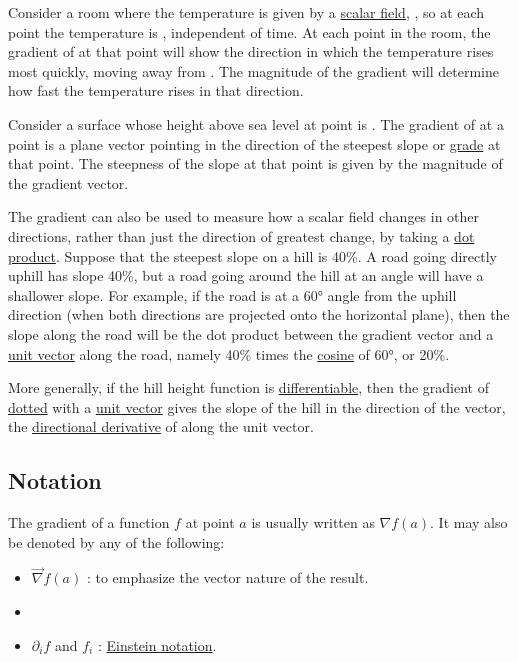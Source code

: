 \documentclass[
]{article}
\begin{document}
Consider a room where the temperature is given by a
\href{scalar_field}{scalar field}, , so at each point the temperature is
, independent of time. At each point in the room, the gradient of at
that point will show the direction in which the temperature rises most
quickly, moving away from . The magnitude of the gradient will determine
how fast the temperature rises in that direction.

Consider a surface whose height above sea level at point is . The
gradient of at a point is a plane vector pointing in the direction of
the steepest slope or \href{Grade_(slope)}{grade} at that point. The
steepness of the slope at that point is given by the magnitude of the
gradient vector.

The gradient can also be used to measure how a scalar field changes in
other directions, rather than just the direction of greatest change, by
taking a \href{dot_product}{dot product}. Suppose that the steepest
slope on a hill is 40\%. A road going directly uphill has slope 40\%,
but a road going around the hill at an angle will have a shallower
slope. For example, if the road is at a 60° angle from the uphill
direction (when both directions are projected onto the horizontal
plane), then the slope along the road will be the dot product between
the gradient vector and a \href{unit_vector}{unit vector} along the
road, namely 40\% times the \url{cosine} of 60°, or 20\%.

More generally, if the hill height function is
\href{differentiable_function}{differentiable}, then the gradient of
\href{dot_product}{dotted} with a \href{unit_vector}{unit vector} gives
the slope of the hill in the direction of the vector, the
\href{directional_derivative}{directional derivative} of along the unit
vector.

\hypertarget{notation}{%
\subsection{Notation}\label{notation}}

The gradient of a function \(f\) at point \(a\) is usually written as
\(\nabla f (a)\). It may also be denoted by any of the following:

\begin{itemize}
\item
  \(\vec{\nabla} f (a)\) : to emphasize the vector nature of the result.
\item
\item
  \(\partial_i f\) and \(f_{i}\) : \href{Einstein_notation}{Einstein
  notation}.
\end{itemize}
\end{document}
